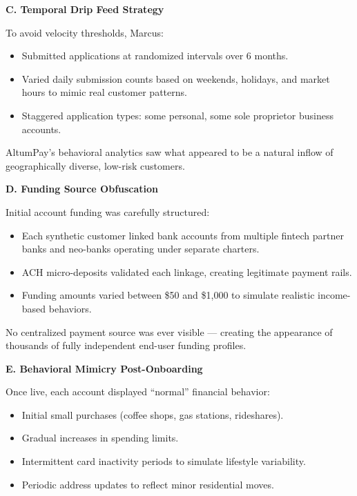 \medskip

\textbf{C. Temporal Drip Feed Strategy}

To avoid velocity thresholds, Marcus:

\begin{itemize}
    \item Submitted applications at randomized intervals over 6 months.
    \item Varied daily submission counts based on weekends, holidays, and market hours to mimic real customer patterns.
    \item Staggered application types: some personal, some sole proprietor business accounts.
\end{itemize}

AltumPay's behavioral analytics saw what appeared to be a natural inflow of geographically diverse, low-risk customers.

\medskip

\textbf{D. Funding Source Obfuscation}

Initial account funding was carefully structured:

\begin{itemize}
    \item Each synthetic customer linked bank accounts from multiple fintech partner banks and neo-banks operating under separate charters.
    \item ACH micro-deposits validated each linkage, creating legitimate payment rails.
    \item Funding amounts varied between \$50 and \$1,000 to simulate realistic income-based behaviors.
\end{itemize}

No centralized payment source was ever visible --- creating the appearance of thousands of fully independent end-user funding profiles.

\medskip

\textbf{E. Behavioral Mimicry Post-Onboarding}

Once live, each account displayed ``normal'' financial behavior:

\begin{itemize}
    \item Initial small purchases (coffee shops, gas stations, rideshares).
    \item Gradual increases in spending limits.
    \item Intermittent card inactivity periods to simulate lifestyle variability.
    \item Periodic address updates to reflect minor residential moves.
\end{itemize}

